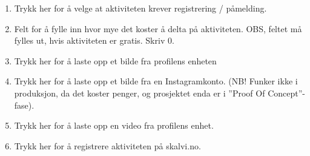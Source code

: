 \begin{enumerate}[nosep]
    \item Trykk her for å velge at aktiviteten krever registrering / påmelding.
    \item Felt for å fylle inn hvor mye det koster å delta på aktiviteten. OBS, feltet må fylles ut, hvis aktiviteten er gratis. Skriv 0.
    \item Trykk her for å laste opp et bilde fra profilens enheten
    \item Trykk her for å laste opp et bilde fra en Instagramkonto. (NB! Funker ikke i produksjon, da det koster penger, og prosjektet enda er i ”Proof Of Concept”- fase).
    \item Trykk her for å laste opp en video fra profilens enhet.
    \item Trykk her for å registrere aktiviteten på skalvi.no.
\end{enumerate}

